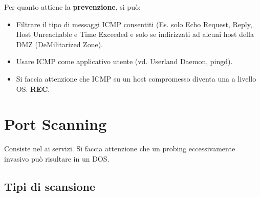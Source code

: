 \documentclass[14pt]{extreport}
\begin{document}
Per quanto attiene la \textbf{prevenzione}, si può:

\begin{itemize}
    \item Filtrare il tipo di messaggi ICMP consentiti (Es. solo Echo Request, Reply, Host Unreachable e Time Exceeded e solo se indirizzati ad alcuni host della DMZ (DeMilitarized Zone).
    \item Usare ICMP come applicativo utente (vd. Userland Daemon, pingd).
    \item Si faccia attenzione che ICMP su un host compromesso diventa una  a livello OS. \textbf{REC}.
\end{itemize}


\section{Port Scanning}
Consiste nel  ai servizi. Si faccia attenzione che un probing eccessivamente invasivo può risultare in un DOS.

\subsection{Tipi di scansione}
\end{document}
